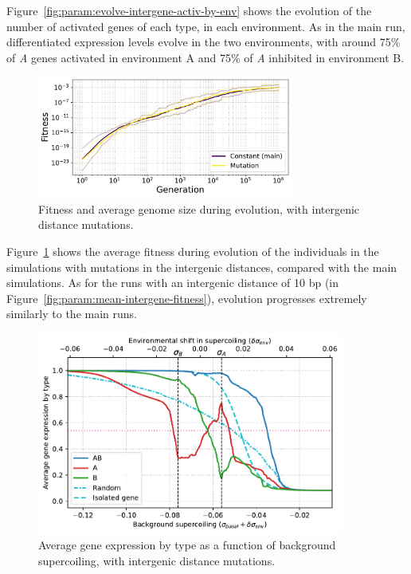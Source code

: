 Figure~\ref{fig:param:evolve-intergene-activ-by-env} shows the evolution of the number of activated genes of each type, in each environment.
As in the main run, differentiated expression levels evolve in the two environments, with around 75\% of \emph{A} genes activated in environment A and 75\% of \emph{A} inhibited in environment B.

\begin{figure}
\centering
  \includegraphics[width=0.75\textwidth]{param/evolve-intergene/fitness_all_with_main.pdf}
\caption[Average fitness and intergenic size during evolution, with intergenic distance mutations]{Fitness and average genome size during evolution, with intergenic distance mutations.}
\label{fig:param:evolve-intergene-fitness}
\end{figure}

Figure~\ref{fig:param:evolve-intergene-fitness} shows the average fitness during evolution of the individuals in the simulations with mutations in the intergenic distances, compared with the main simulations.
As for the runs with an intergenic distance of 10 bp (in Figure~\ref{fig:param:mean-intergene-fitness}), evolution progresses extremely similarly to the main runs.

\begin{figure}[H]
\centering
\includegraphics[width=0.9\textwidth]{param/evolve-intergene/activity_sigmas_avg.pdf}
\caption[Average gene expression as a function of background supercoiling, with intergenic distance mutations]{Average gene expression by type as a function of background supercoiling, with intergenic distance mutations.}
\label{fig:param:evolve-intergene-activ-by-sigma}
\end{figure}


